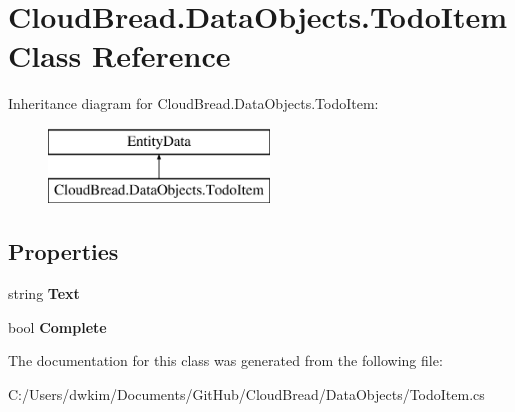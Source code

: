 \hypertarget{a00106}{}\section{Cloud\+Bread.\+Data\+Objects.\+Todo\+Item Class Reference}
\label{a00106}
Inheritance diagram for Cloud\+Bread.\+Data\+Objects.\+Todo\+Item\+:\begin{figure}[H]
\begin{center}
\leavevmode
\includegraphics[height=2.000000cm]{a00106}
\end{center}
\end{figure}
\subsection*{Properties}
\begin{DoxyCompactItemize}
\item 
string {\bfseries Text}\hypertarget{a00106_a92bc3a18d35fe87c89d1209d8962c254}{}\label{a00106_a92bc3a18d35fe87c89d1209d8962c254}

\item 
bool {\bfseries Complete}\hypertarget{a00106_a0e5fa4c8b2ca710b5065bdbfe695036e}{}\label{a00106_a0e5fa4c8b2ca710b5065bdbfe695036e}

\end{DoxyCompactItemize}


The documentation for this class was generated from the following file\+:\begin{DoxyCompactItemize}
\item 
C\+:/\+Users/dwkim/\+Documents/\+Git\+Hub/\+Cloud\+Bread/\+Data\+Objects/Todo\+Item.\+cs\end{DoxyCompactItemize}
